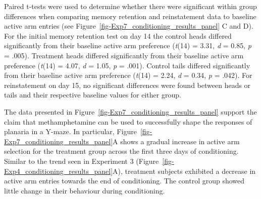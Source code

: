 \documentclass[
  jou,
  floatsintext,
  longtable,
  nolmodern,
  notxfonts,
  notimes,
  donotrepeattitle,
  colorlinks=true,linkcolor=blue,citecolor=blue,urlcolor=blue]{apa7}
\begin{document}
Paired t-tests were used to determine whether there were significant
within group differences when comparing memory retention and
reinstatement data to baseline active arm entries (see
Figure~\ref{fig-Exp7_conditioning_results_panel} C and D). For the
initial memory retention test on day 14 the control heads differed
significantly from their baseline active arm preference (\emph{t}(14) =
3.31, \emph{d} = 0.85, \emph{p} = .005). Treatment heads differed
significantly from their baseline active arm preference (\emph{t}(14) =
4.07, \emph{d} = 1.05, \emph{p} = .001). Control tails differed
significantly from their baseline active arm preference (\emph{t}(14) =
2.24, \emph{d} = 0.34, \emph{p} = .042). For reinstatement on day 15, no
significant differences were found between heads or tails and their
respective baseline values for either group.

The data presented in Figure~\ref{fig-Exp7_conditioning_results_panel}
support the claim that methamphetamine can be used to successfully shape
the responses of planaria in a Y-maze. In particular,
Figure~\ref{fig-Exp7_conditioning_results_panel}A shows a gradual
increase in active arm selection for the treatment group across the
first three days of conditioning. Similar to the trend seen in
Experiment 3 (Figure~\ref{fig-Exp4_conditioning_results_panel}A),
treatment subjects exhibited a decrease in active arm entries towards
the end of conditioning. The control group showed little change in their
behaviour during conditioning.
\end{document}
